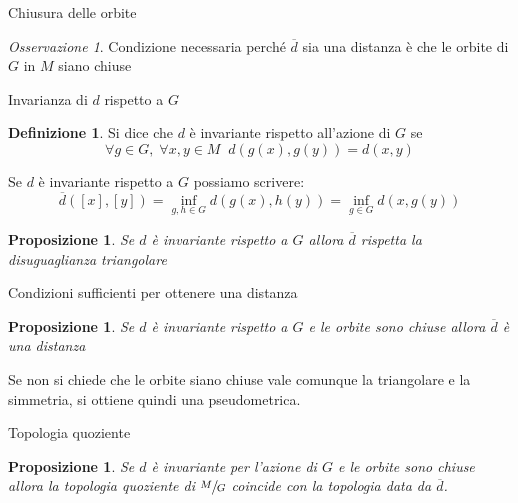 \documentclass{beamer}
\newcounter{counter1}
\theoremstyle{plain}
\newtheorem{mypro}[counter1]{Proposizione}
\theoremstyle{definition}
\newtheorem{mydef}[counter1]{Definizione}
\theoremstyle{remark}
\newtheorem{myoss}[counter1]{Osservazione}
\newcommand{\obar}[1]{\overline{#1}}
\newcommand{\bra}[1]{\left[#1\right]}
\begin{document}
\begin{frame}{Chiusura delle orbite}
  \begin{myoss}
    Condizione necessaria perché $\obar d$ sia una distanza è che le
    orbite di $G$ in $M$ siano chiuse
  \end{myoss}
  
\end{frame}

\begin{frame}{Invarianza di $d$ rispetto a $G$}
  \begin{mydef}
    Si dice che $d$ è invariante rispetto all'azione di $G$ se
    \[ \forall g \in G,\; \forall x,y \in M \;\; d(g(x),g(y)) = d(x,y) \]
  \end{mydef}
  Se $d$ è invariante rispetto a $G$ possiamo scrivere:
  \[ \obar d (\bra{x}, \bra{y}) = \inf _ {g,h \in G} d(g(x), h(y)) =
  \inf _{g \in G} d(x,g(y)) \]

  \begin{mypro}
    Se $d$ è invariante rispetto a $G$ allora $\obar d$ rispetta la
    disuguaglianza triangolare
  \end{mypro}
\end{frame}

\begin{frame}{Condizioni sufficienti per ottenere una distanza}
  \begin{mypro}
    Se $d$ è invariante rispetto a $G$ e le orbite sono chiuse allora
    $\obar d$ è una distanza
  \end{mypro}
  Se non si chiede che le orbite siano chiuse vale comunque la
  triangolare e la simmetria, si ottiene quindi una pseudometrica.
\end{frame}

\begin{frame}{Topologia quoziente}
  \begin{mypro}
    Se $d$ è invariante per l'azione di $G$ e le orbite sono chiuse
    allora la topologia quoziente di $\sfrac{M}{G}$ coincide con la
    topologia data da $\obar d$.
  \end{mypro}

\end{frame}
\end{document}
